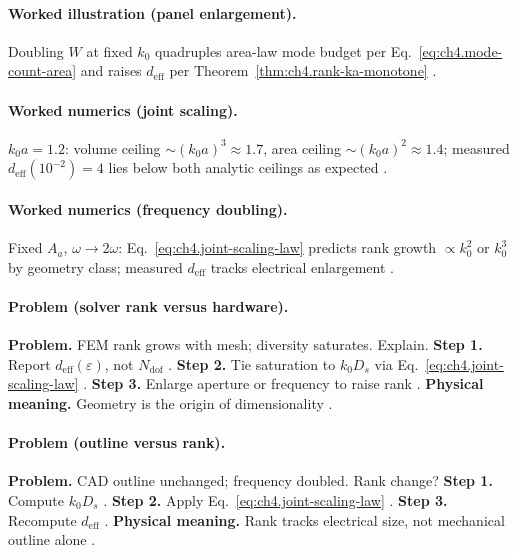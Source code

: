 \paragraph{Worked illustration (panel enlargement).}
Doubling \(W\) at fixed \(k_{0}\) quadruples area-law mode budget per Eq.~\eqref{eq:ch4.mode-count-area} and raises \(d_{\mathrm{eff}}\) per
Theorem~\ref{thm:ch4.rank-ka-monotone} \cite{collin2001,jackson1999,hansen1988,harrington2001}.

\paragraph{Worked numerics (joint scaling).}
\(k_{0}a=1.2\): volume ceiling \(\sim(k_{0}a)^{3}\approx1.7\), area ceiling \(\sim(k_{0}a)^{2}\approx1.4\); measured \(d_{\mathrm{eff}}(10^{-2})=4\) lies
below both analytic ceilings as expected \cite{hansen1988,stratton1941,devaney2004}.

\paragraph{Worked numerics (frequency doubling).}
Fixed \(A_{a}\), \(\omega\to2\omega\): Eq.~\eqref{eq:ch4.joint-scaling-law} predicts rank growth \(\propto k_{0}^{2}\) or \(k_{0}^{3}\) by geometry class;
measured \(d_{\mathrm{eff}}\) tracks electrical enlargement \cite{jackson1999,harrington2001,collin2001}.

\paragraph{Problem (solver rank versus hardware).}
\textbf{Problem.} FEM rank grows with mesh; diversity saturates. Explain.
\textbf{Step 1.} Report \(d_{\mathrm{eff}}(\varepsilon)\), not \(N_{\mathrm{dof}}\) \cite{harrington2001,devaney2004}.
\textbf{Step 2.} Tie saturation to \(k_{0}D_{s}\) via Eq.~\eqref{eq:ch4.joint-scaling-law} \cite{jackson1999,hansen1988}.
\textbf{Step 3.} Enlarge aperture or frequency to raise rank \cite{stratton1941}.
\textbf{Physical meaning.} Geometry is the origin of dimensionality \cite{stratton1941,harrington2001}.

\paragraph{Problem (outline versus rank).}
\textbf{Problem.} CAD outline unchanged; frequency doubled. Rank change?
\textbf{Step 1.} Compute \(k_{0}D_{s}\) \cite{jackson1999}.
\textbf{Step 2.} Apply Eq.~\eqref{eq:ch4.joint-scaling-law} \cite{hansen1988,harrington2001}.
\textbf{Step 3.} Recompute \(d_{\mathrm{eff}}\) \cite{devaney2004}.
\textbf{Physical meaning.} Rank tracks electrical size, not mechanical outline alone \cite{stratton1941,collin2001}.

